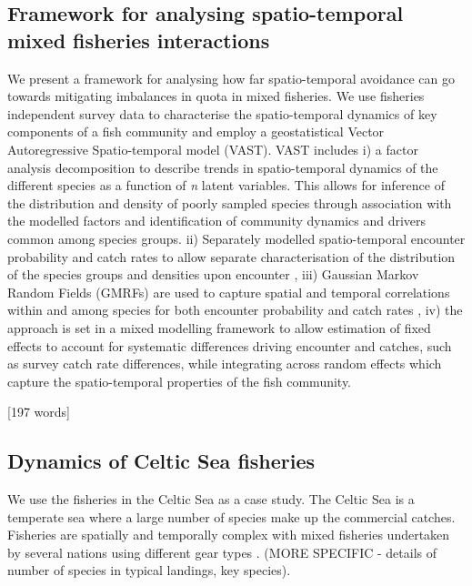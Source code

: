 \documentclass{nature}
\begin{document}
\begin{linenumbers}
[570 words]

\subsection{Framework for analysing spatio-temporal mixed fisheries
	interactions}

We present a framework for analysing how far spatio-temporal avoidance can go
towards mitigating imbalances in quota in mixed fisheries. We use fisheries
independent survey data to characterise the spatio-temporal dynamics of key
components of a fish community and employ a geostatistical Vector
Autoregressive Spatio-temporal model (VAST). VAST includes i) a factor analysis
decomposition to describe trends in spatio-temporal dynamics of the different
species as a function of \textit{n} latent variables\cite{Thorson2015}. This
allows for inference of the distribution and density of poorly sampled species
through association with the modelled factors and identification of community
dynamics and drivers common among species groups. ii) Separately modelled
spatio-temporal encounter probability and catch rates to allow separate
characterisation of the distribution of the species groups and densities upon
encounter \cite{Thorson2015a}, iii) Gaussian Markov Random Fields (GMRFs) are
used to capture spatial and temporal correlations within and among species for
both encounter probability and catch rates \cite{Thorson2013}, iv) the approach
is set in a mixed modelling framework to allow estimation of fixed effects to
account for systematic differences driving encounter and catches, such as
survey catch rate differences, while integrating across random effects which
capture the spatio-temporal properties of the fish community.

[197 words]

\subsection{Dynamics of Celtic Sea fisheries}

We use the fisheries in the Celtic Sea as a case study. The Celtic Sea is a
temperate sea where a large number of species make up the commercial catches.
Fisheries are spatially and temporally complex with mixed fisheries undertaken
by several nations using different gear types \cite{Ellis2000, Gerritsen2012}.
(MORE SPECIFIC - details of number of species in typical landings, key
species).


\end{linenumbers}
\end{document}
